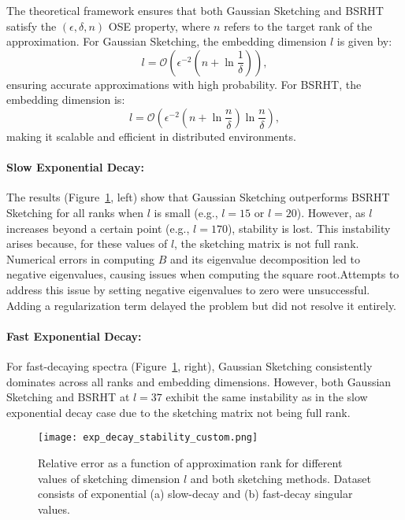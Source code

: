 \documentclass[a4paper, 12pt,oneside]{article}
\begin{document}
The theoretical framework ensures that both Gaussian Sketching and BSRHT satisfy the $(\epsilon, \delta, n)$ OSE property, where \( n \) refers to the target rank of the approximation. For Gaussian Sketching, the embedding dimension \( l \) is given by:
\begin{equation}
l = \mathcal{O}\left(\epsilon^{-2}(n + \ln \frac{1}{\delta})\right),
\end{equation}
ensuring accurate approximations with high probability. For BSRHT, the embedding dimension is:
\begin{equation}
l = \mathcal{O}\left(\epsilon^{-2}(n + \ln \frac{n}{\delta}) \ln \frac{n}{\delta}\right),
\end{equation}
making it scalable and efficient in distributed environments.
\paragraph{Slow Exponential Decay:}
The results (Figure~\ref{fig:slow_fast_exp_decay}, left) show that Gaussian Sketching outperforms BSRHT Sketching for all ranks when \( l \) is small (e.g., \( l = 15 \) or \( l = 20 \)). However, as \( l \) increases beyond a certain point (e.g., \( l = 170 \)), stability is lost. This instability arises because, for these values of \( l \), the sketching matrix is not full rank. Numerical errors in computing \( B \) and its eigenvalue decomposition led to negative eigenvalues, causing issues when computing the square root.Attempts to address this issue by setting negative eigenvalues to zero were unsuccessful. Adding a regularization term delayed the problem but did not resolve it entirely.

\paragraph{Fast Exponential Decay:}
For fast-decaying spectra (Figure~\ref{fig:slow_fast_exp_decay}, right), Gaussian Sketching consistently dominates across all ranks and embedding dimensions. However, both Gaussian Sketching and BSRHT at \( l = 37 \) exhibit the same instability as in the slow exponential decay case due to the sketching matrix not being full rank.

\begin{figure}[H]
\centering
\texttt{[image: exp\_decay\_stability\_custom.png]}
\caption{Relative error as a function of approximation rank for different values of sketching dimension \( l \) and both sketching methods. Dataset consists of exponential (a) slow-decay and (b) fast-decay singular values.}
\label{fig:slow_fast_exp_decay}
\end{figure}
\end{document}
